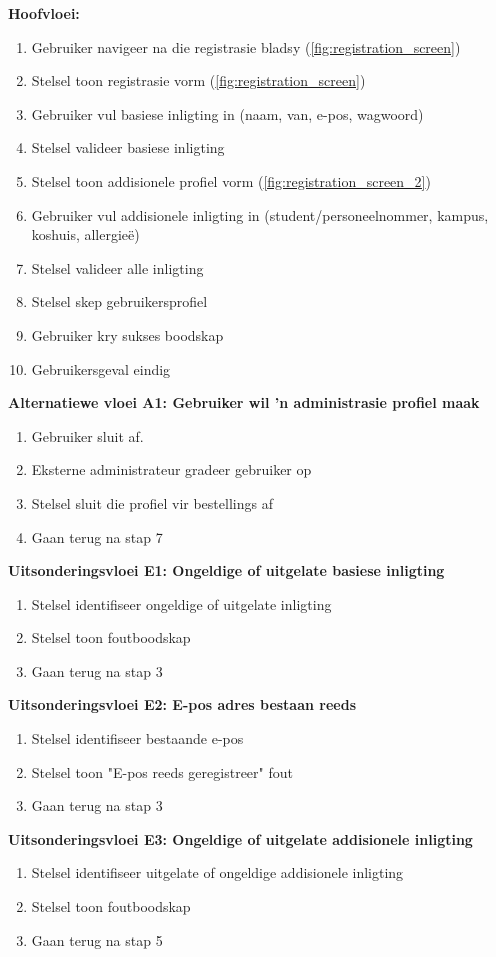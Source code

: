 \textbf{Hoofvloei:}
\begin{enumerate}
    \item Gebruiker navigeer na die registrasie bladsy (\autoref{fig:registration_screen})
    \item Stelsel toon registrasie vorm (\autoref{fig:registration_screen})
    \item Gebruiker vul basiese inligting in (naam, van, e-pos, wagwoord)
    \item Stelsel valideer basiese inligting
    \item Stelsel toon addisionele profiel vorm (\autoref{fig:registration_screen_2})
    \item Gebruiker vul addisionele inligting in (student/personeelnommer, kampus, koshuis, allergieë)
    \item Stelsel valideer alle inligting
    \item Stelsel skep gebruikersprofiel
    \item Gebruiker kry sukses boodskap
    \item Gebruikersgeval eindig
\end{enumerate}

\textbf{Alternatiewe vloei A1: Gebruiker wil 'n administrasie profiel maak}
\begin{enumerate}
    \item[5a.] Gebruiker sluit af.
    \item Eksterne administrateur gradeer gebruiker op
    \item Stelsel sluit die profiel vir bestellings af
    \item Gaan terug na stap 7
\end{enumerate}

\textbf{Uitsonderingsvloei E1: Ongeldige of uitgelate basiese inligting}
\begin{enumerate}
    \item[4a.] Stelsel identifiseer ongeldige of uitgelate inligting
    \item Stelsel toon foutboodskap
    \item Gaan terug na stap 3
\end{enumerate}

\textbf{Uitsonderingsvloei E2: E-pos adres bestaan reeds}
\begin{enumerate}
    \item[4b.] Stelsel identifiseer bestaande e-pos
    \item Stelsel toon "E-pos reeds geregistreer" fout
    \item Gaan terug na stap 3
\end{enumerate}

\textbf{Uitsonderingsvloei E3: Ongeldige of uitgelate addisionele inligting}
\begin{enumerate}
    \item[7a.] Stelsel identifiseer uitgelate of ongeldige addisionele inligting
    \item Stelsel toon foutboodskap
    \item Gaan terug na stap 5
\end{enumerate}
